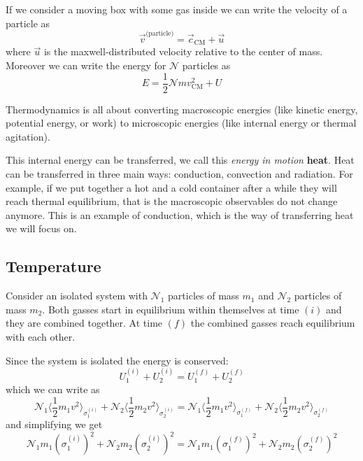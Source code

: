 \documentclass[12pt]{extarticle}
\newcommand{\anglebraces}[1]{
    \langle #1 \rangle
}
\begin{document}
If we consider a moving box with some gas inside we can write the velocity of a particle as
\begin{equation}
    \vec v^{\text{(particle)}} = \vec c_{\text{CM}} + \vec u
\end{equation}
where $\vec u$ is the maxwell-distributed velocity relative to the center of mass.
Moreover we can write the energy for $\mathscr{N}$ particles as
\begin{equation}
    E = \frac{1}{2} \mathscr{N} m v_{\text{CM}}^2 + U
\end{equation}

Thermodynamics is all about converting macroscopic energies (like kinetic energy, potential energy, or work) to microscopic energies (like internal energy or thermal agitation).

This internal energy can be transferred, we call this \emph{energy in motion} \textbf{heat}.
Heat can be transferred in three main ways: conduction, convection and radiation.
For example, if we put together a hot and a cold container after a while they will reach thermal equilibrium, that is the macroscopic observables do not change anymore.
This is an example of conduction, which is the way of transferring heat we will focus on.

\subsection{Temperature}

Consider an isolated system with $\mathscr{N}_1$ particles of mass $m_1$ and $\mathscr{N}_2$ particles of mass $m_2$.
Both gasses start in equilibrium within themselves at time $(i)$ and they are combined together.
At time $(f)$ the combined gasses reach equilibrium with each other.

Since the system is isolated the energy is conserved:
\begin{equation}
    U_1^{(i)} + U_2^{(i)} = U_1^{(f)} + U_2^{(f)}
\end{equation}
which we can write as
\begin{equation}
    \mathscr{N}_1 \anglebraces{\frac{1}{2} m_1 v^2}_{\sigma_1^{(i)}} + \mathscr{N}_2 \anglebraces{\frac{1}{2} m_2 v^2}_{\sigma_2^{(i)}} = \mathscr{N}_1 \anglebraces{\frac{1}{2} m_1 v^2}_{\sigma_1^{(f)}} + \mathscr{N}_2 \anglebraces{\frac{1}{2} m_2 v^2}_{\sigma_2^{(f)}}
\end{equation}
and simplifying we get
\begin{equation}
    \mathscr{N}_1 m_1 \left(\sigma_1^{(i)}\right)^2 + \mathscr{N}_2 m_2 \left(\sigma_2^{(i)}\right)^2 = \mathscr{N}_1 m_1 \left(\sigma_1^{(f)}\right)^2 + \mathscr{N}_2 m_2 \left(\sigma_2^{(f)}\right)^2
\end{equation}
\end{document}
